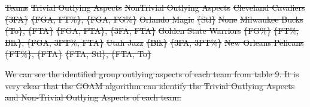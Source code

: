 \documentclass[
 size=14pt,
 paper=smartboard,  %
 mode=present, 		%
 display=slides, 	%
 style=tuliplab,  	%
 pauseslide,
 fleqn,leqno]{powerdot}
\providecommand{\DIFdeltex}[1]{{\protect\color{red}\sout{#1}}}                      %
\providecommand{\DIFdelFL}[1]{\DIFdel{#1}} %
\providecommand{\DIFdel}[1]{\texorpdfstring{\DIFdeltex{#1}}{}} %
\begin{document}
\DIFdelFL{Teams                   }%
\DIFdelFL{Trivial Outlying Aspects  }%
\DIFdelFL{NonTrivial Outlying Aspects    }%
\DIFdelFL{Cleveland Cavaliers     }%
\DIFdelFL{\{3FA\}                   }%
\DIFdelFL{\{FGA, FT\%\}, \{FGA, FG\%\} }%
\DIFdelFL{Orlando Magic           }%
\DIFdelFL{\{Stl\}                   }%
\DIFdelFL{None                         }%
\DIFdelFL{Milwaukee Bucks         }%
\DIFdelFL{\{To\}, \{FTA\}           }%
\DIFdelFL{\{FGA, FTA\}, \{3FA, FTA\}     }%
\DIFdelFL{Golden State Warriors   }%
\DIFdelFL{\{FG\%\}                  }%
\DIFdelFL{\{FT\%, Blk\}, \{FGA, 3PT\%, FTA\}}%
\DIFdelFL{Utah Jazz               }%
\DIFdelFL{\{Blk\}                   }%
\DIFdelFL{\{3FA, 3PT\%\}                    }%
\DIFdelFL{New Orleans Pelicans    }%
\DIFdelFL{\{FT\%\}, \{FTA\}         }%
\DIFdelFL{\{FTA, Stl\}, \{FTA, To\}          }%

\DIFdel{We can see the identified group outlying aspects of each team from table $9$.
It is very clear that the GOAM algorithm can identify the
Trivial Outlying Aspects and Non-Trivial Outlying Aspects of each team.
}%

\end{document}
